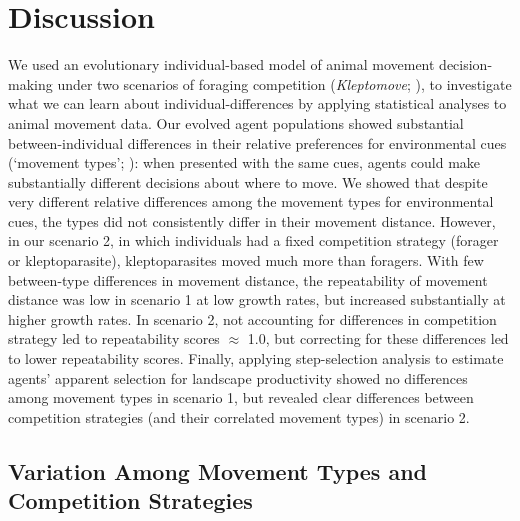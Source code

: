     \section{Discussion}
    
    
    We used an evolutionary individual-based model of animal movement decision-making under two scenarios of foraging competition (\textit{Kleptomove}; \citealt{gupte2021a,netz2022a}), to investigate what we can learn about individual-differences by applying statistical analyses to animal movement data.
    Our evolved agent populations showed substantial between-individual differences in their relative preferences for environmental cues (`movement types'; \citealt{getz2015}): when presented with the same cues, agents could make substantially different decisions about where to move.
    We showed that despite very different relative differences among the movement types for environmental cues, the types did not consistently differ in their movement distance.
    However, in our scenario 2, in which individuals had a fixed competition strategy (forager or kleptoparasite), kleptoparasites moved much more than foragers.
    With few between-type differences in movement distance, the repeatability of movement distance was low in scenario 1 at low growth rates, but increased substantially at higher growth rates.
    In scenario 2, not accounting for differences in competition strategy led to repeatability scores $\approx$ 1.0, but correcting for these differences led to lower repeatability scores.
    Finally, applying step-selection analysis to estimate agents' apparent selection for landscape productivity showed no differences among movement types in scenario 1, but revealed clear differences between competition strategies (and their correlated movement types) in scenario 2.
    
    \subsection*{Variation Among Movement Types and Competition Strategies}
    
